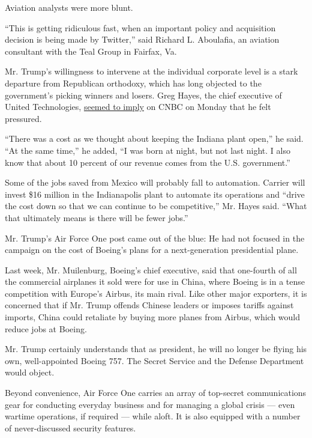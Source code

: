 Aviation analysts were more blunt.

``This is getting ridiculous fast, when an important policy and
acquisition decision is being made by Twitter,'' said Richard L.
Aboulafia, an aviation consultant with the Teal Group in Fairfax, Va.

Mr. Trump's willingness to intervene at the individual corporate level
is a stark departure from Republican orthodoxy, which has long objected
to the government's picking winners and losers. Greg Hayes, the chief
executive of United Technologies,
\href{http://www.cnbc.com/2016/12/05/cnbc-transcript-united-technologies-chairman-ceo-greg-hayes-on-cnbcs-mad-money-w-jim-cramer-today.html}{seemed
to imply} on CNBC on Monday that he felt pressured.

``There was a cost as we thought about keeping the Indiana plant open,''
he said. ``At the same time,'' he added, ``I was born at night, but not
last night. I also know that about 10 percent of our revenue comes from
the U.S. government.''

Some of the jobs saved from Mexico will probably fall to automation.
Carrier will invest \$16 million in the Indianapolis plant to automate
its operations and ``drive the cost down so that we can continue to be
competitive,'' Mr. Hayes said. ``What that ultimately means is there
will be fewer jobs.''

Mr. Trump's Air Force One post came out of the blue: He had not focused
in the campaign on the cost of Boeing's plans for a next-generation
presidential plane.

Last week, Mr. Muilenburg, Boeing's chief executive, said that
one-fourth of all the commercial airplanes it sold were for use in
China, where Boeing is in a tense competition with Europe's Airbus, its
main rival. Like other major exporters, it is concerned that if Mr.
Trump offends Chinese leaders or imposes tariffs against imports, China
could retaliate by buying more planes from Airbus, which would reduce
jobs at Boeing.

Mr. Trump certainly understands that as president, he will no longer be
flying his own, well-appointed Boeing 757. The Secret Service and the
Defense Department would object.

Beyond convenience, Air Force One carries an array of top-secret
communications gear for conducting everyday business and for managing a
global crisis --- even wartime operations, if required --- while aloft.
It is also equipped with a number of never-discussed security features.

